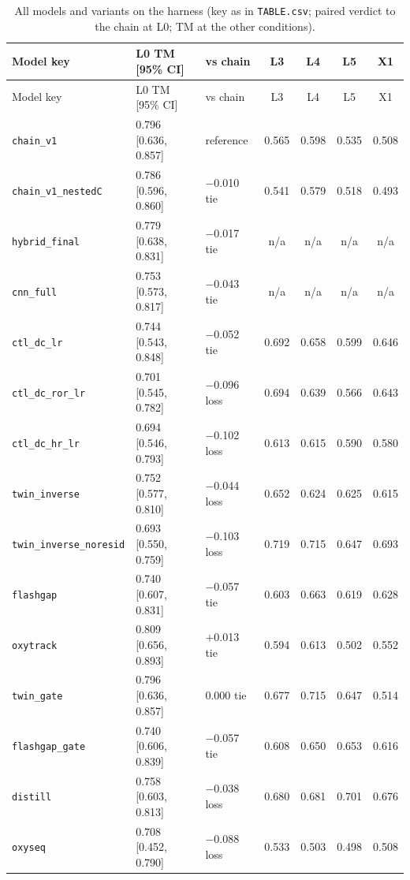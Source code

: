 {\scriptsize\setlength{\tabcolsep}{3pt}
\begin{longtable}{@{}p{3.4cm}p{3.3cm}p{2.7cm}cccc@{}}
\caption{All models and variants on the harness (key as in \texttt{TABLE.csv}; paired verdict to the chain at L0; TM at the other conditions).}\label{tab:full}\\
\toprule
Model key & L0 TM [95\% CI] & vs chain & L3 & L4 & L5 & X1 \\
\midrule
\endfirsthead
\toprule
Model key & L0 TM [95\% CI] & vs chain & L3 & L4 & L5 & X1 \\
\midrule
\endhead
\bottomrule
\endfoot
\texttt{chain\_v1} & 0.796 [0.636, 0.857] &  reference & 0.565 & 0.598 & 0.535 & 0.508 \\
\texttt{chain\_v1\_nestedC} & 0.786 [0.596, 0.860] & $-$0.010 tie & 0.541 & 0.579 & 0.518 & 0.493 \\
\texttt{hybrid\_final} & 0.779 [0.638, 0.831] & $-$0.017 tie & n/a & n/a & n/a & n/a \\
\texttt{cnn\_full} & 0.753 [0.573, 0.817] & $-$0.043 tie & n/a & n/a & n/a & n/a \\
\texttt{ctl\_dc\_lr} & 0.744 [0.543, 0.848] & $-$0.052 tie & 0.692 & 0.658 & 0.599 & 0.646 \\
\texttt{ctl\_dc\_ror\_lr} & 0.701 [0.545, 0.782] & $-$0.096 loss & 0.694 & 0.639 & 0.566 & 0.643 \\
\texttt{ctl\_dc\_hr\_lr} & 0.694 [0.546, 0.793] & $-$0.102 loss & 0.613 & 0.615 & 0.590 & 0.580 \\
\texttt{twin\_inverse} & 0.752 [0.577, 0.810] & $-$0.044 loss & 0.652 & 0.624 & 0.625 & 0.615 \\
\texttt{twin\_inverse\_noresid} & 0.693 [0.550, 0.759] & $-$0.103 loss & 0.719 & 0.715 & 0.647 & 0.693 \\
\texttt{flashgap} & 0.740 [0.607, 0.831] & $-$0.057 tie & 0.603 & 0.663 & 0.619 & 0.628 \\
\texttt{oxytrack} & 0.809 [0.656, 0.893] & $+$0.013 tie & 0.594 & 0.613 & 0.502 & 0.552 \\
\texttt{twin\_gate} & 0.796 [0.636, 0.857] & 0.000 tie & 0.677 & 0.715 & 0.647 & 0.514 \\
\texttt{flashgap\_gate} & 0.740 [0.606, 0.839] & $-$0.057 tie & 0.608 & 0.650 & 0.653 & 0.616 \\
\texttt{distill} & 0.758 [0.603, 0.813] & $-$0.038 loss & 0.680 & 0.681 & 0.701 & 0.676 \\
\texttt{oxyseq} & 0.708 [0.452, 0.790] & $-$0.088 loss & 0.533 & 0.503 & 0.498 & 0.508 \\

\end{longtable}}
